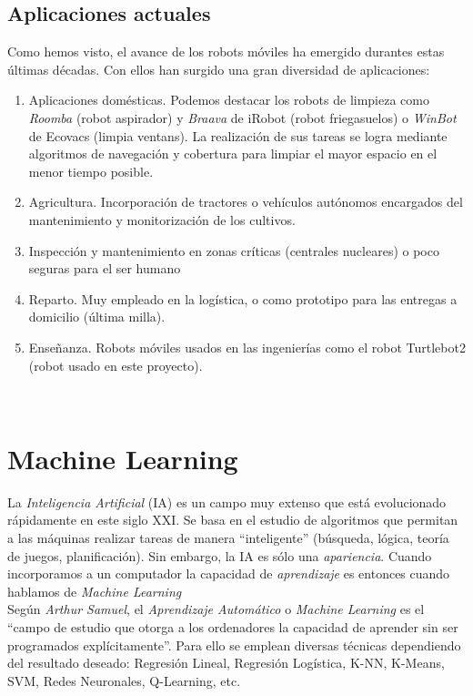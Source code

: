 \subsection{Aplicaciones actuales}
\label{subsec:aplicaciones_actuales}
Como hemos visto, el avance de los robots móviles ha emergido durantes estas últimas décadas. Con ellos han surgido una gran diversidad de aplicaciones:

\begin{enumerate}
	\item Aplicaciones domésticas. Podemos destacar los robots de limpieza como \textit{Roomba} (robot aspirador) y \textit{Braava} de iRobot (robot friegasuelos) o \textit{WinBot} de Ecovacs (limpia ventans). La realización de sus tareas se logra mediante algoritmos de navegación y cobertura para limpiar el mayor espacio en el menor tiempo posible.
	\item Agricultura. Incorporación de tractores o vehículos autónomos encargados del mantenimiento y monitorización de los cultivos.
	\item Inspección y mantenimiento en zonas críticas (centrales nucleares) o poco seguras para el ser humano
	\item Reparto. Muy empleado en la logística, o como prototipo para las entregas a domicilio (última milla).
	\item Enseñanza. Robots móviles usados en las ingenierías como el robot Turtlebot2 (robot usado en este proyecto).
\end{enumerate}\



\section{Machine Learning}
\label{sec:machine_learning}
La \textit{Inteligencia Artificial} (IA) es un campo muy extenso que está evolucionado rápidamente en este siglo XXI. Se basa en el estudio de algoritmos que permitan a las máquinas realizar tareas de manera ``inteligente'' (búsqueda, lógica, teoría de juegos, planificación). Sin embargo, la IA es sólo una \textit{apariencia}. Cuando incorporamos a un computador la capacidad de \textit{aprendizaje} es entonces cuando hablamos de \textit{Machine Learning}\\

Según \emph{Arthur Samuel}, el \textit{Aprendizaje Automático} o \textit{Machine Learning} es el ``campo de estudio que otorga a los ordenadores la capacidad de aprender sin ser programados explícitamente''. Para ello se emplean diversas técnicas dependiendo del resultado deseado: Regresión Lineal, Regresión Logística, K-NN, K-Means, SVM, Redes Neuronales, Q-Learning, etc.\\


